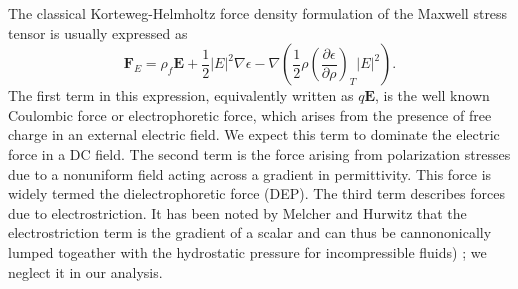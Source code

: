 \documentclass[a4paper, 12pt]{article}
\begin{document}
The classical Korteweg-Helmholtz force density formulation of the Maxwell stress tensor is usually expressed as \cite{melcher_continuum_????}
\begin{equation}\label{force_density}
\mathbf{F}_E = \rho_f \mathbf{E} + \frac{1}{2} \left| E \right|^2 \nabla \epsilon - \nabla \left( \frac{1}{2} \rho \left( \frac{\partial \epsilon}{\partial \rho} \right)_T \left| E \right|^2 \right) .
\end{equation}
The first term in this expression, equivalently written as $q\mathbf{E}$, is the well known Coulombic force or electrophoretic force, which arises from the presence of free charge in an external electric field. We expect this term to dominate the electric force in a DC field. The second term is the force arising from polarization stresses due to a nonuniform field acting across a gradient in permittivity. This force is widely termed the dielectrophoretic force (DEP). The third term describes forces due to electrostriction. It has been noted by Melcher and Hurwitz that the electrostriction term is the gradient of a scalar and can thus be cannononically lumped togeather with the hydrostatic pressure for incompressible fluids) \cite{hurwitz_electrohydrodynamic_1966}; we neglect it in our analysis. 
\end{document}
